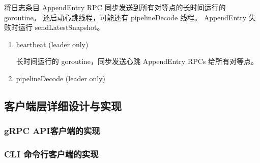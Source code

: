 \begin{enumerate}
				将日志条目 AppendEntry RPC 同步发送到所有对等点的长时间运行的 goroutine。 还启动心跳线程，可能还有 pipelineDecode 线程。 AppendEntry 失败时运行 sendLatestSnapshot。
				
				\begin{enumerate}
				
					\item heartbeat (leader only) 
					
					长时间运行的 goroutine，同步发送心跳 AppendEntry RPCs 给所有对等点。


					
					\item pipelineDecode (leader only)
					
				\end{enumerate}

			\end{enumerate}

  	\subsection{客户端层详细设计与实现}
  			
		\subsubsection{gRPC API客户端的实现}
			 	
		\subsubsection{CLI 命令行客户端的实现}
		

    
 \clearpage